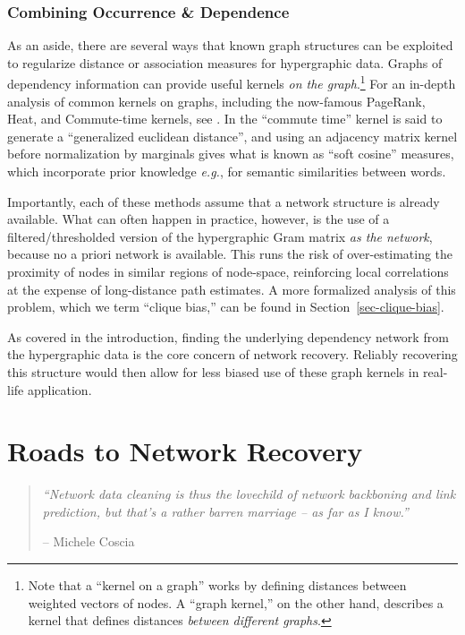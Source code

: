 \documentclass[%
	12pt,
		oneside,
		letterpaper
]{book}
\begin{document}
\subsection{Combining Occurrence \& Dependence}\label{combining-occurrence-dependence}

As an aside, there are several ways that known graph structures can be exploited to regularize distance or association measures for hypergraphic data.
Graphs of dependency information can provide useful kernels \emph{on the graph}.\footnote{
  Note that a ``kernel on a graph'' works by defining distances between weighted vectors of nodes.
  A ``graph kernel,'' on the other hand, describes a kernel that defines distances \emph{between different graphs}.
}
For an in-depth analysis of common kernels on graphs, including the now-famous PageRank, Heat, and Commute-time kernels, see \textcite{SimilaritiesgraphsKernels_Avrachenkov2019}.
In \textcite{GeneralizedEuclideanmeasure_Coscia2020} the ``commute time'' kernel is said to generate a ``generalized euclidean distance'', and using an adjacency matrix kernel before normalization by marginals gives what is known as ``soft cosine'' measures, which incorporate prior knowledge \emph{e.g.}, for semantic similarities between words.

Importantly, each of these methods assume that a network structure is already available.
What can often happen in practice, however, is the use of a filtered/thresholded version of the hypergraphic Gram matrix \emph{as the network}, because no a priori network is available.
This runs the risk of over-estimating the proximity of nodes in similar regions of node-space, reinforcing local correlations at the expense of long-distance path estimates.
A more formalized analysis of this problem, which we term ``clique bias,'' can be found in Section~\ref{sec-clique-bias}.

As covered in the introduction, finding the underlying dependency network from the hypergraphic data is the core concern of network recovery.
Reliably recovering this structure would then allow for less biased use of these graph kernels in real-life application.

\chapter{Roads to Network Recovery}\label{sec-lit-review}

\begin{flushright}

\begin{minipage}{.7\linewidth}

\singlespacing

\begin{quote}
\emph{``Network data cleaning is thus the lovechild of network backboning and link prediction, but that's a rather barren marriage -- as far as I know.''}

\hfill -- Michele Coscia\\
\doublespacing
\end{quote}

\end{minipage}

\end{flushright}
\end{document}

